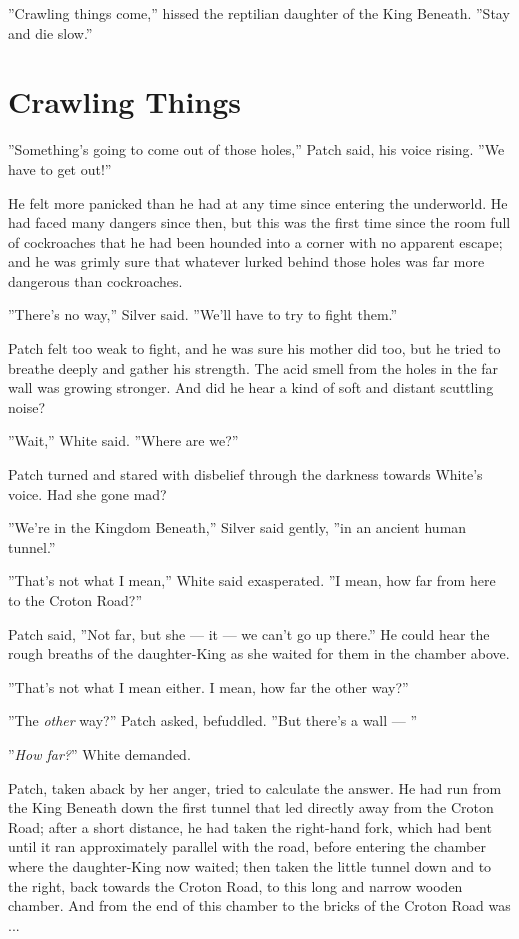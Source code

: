\documentclass[12pt]{book}
\begin{document}
''Crawling things come,'' hissed the reptilian daughter of the King Beneath. ''Stay and die slow.''


\section{Crawling Things}

''Something's going to come out of those holes,'' Patch said, his voice rising. ''We have to get out!''

He felt more panicked than he had at any time since entering the underworld. He had faced many dangers since then, but this was the first time since the room full of cockroaches that he had been hounded into a corner with no apparent escape; and he was grimly sure that whatever lurked behind those holes was far more dangerous than cockroaches.

''There's no way,'' Silver said. ''We'll have to try to fight them.''

Patch felt too weak to fight, and he was sure his mother did too, but he tried to breathe deeply and gather his strength. The acid smell from the holes in the far wall was growing stronger. And did he hear a kind of soft and distant scuttling noise?

''Wait,'' White said. ''Where are we?''

Patch turned and stared with disbelief through the darkness towards White's voice. Had she gone mad?

''We're in the Kingdom Beneath,'' Silver said gently, ''in an ancient human tunnel.''

''That's not what I mean,'' White said exasperated. ''I mean, how far from here to the Croton Road?''

Patch said, ''Not far, but she ---
it ---
we can't go up there.'' He could hear the rough breaths of the daughter-King as she waited for them in the chamber above.

''That's not what I mean either. I mean, how far the other way?''

''The {\it other} way?'' Patch asked, befuddled. ''But there's a wall ---
''

''{\it How far?}'' White demanded.

Patch, taken aback by her anger, tried to calculate the answer. He had run from the King Beneath down the first tunnel that led directly away from the Croton Road; after a short distance, he had taken the right-hand fork, which had bent until it ran approximately parallel with the road, before entering the chamber where the daughter-King now waited; then taken the little tunnel down and to the right, back towards the Croton Road, to this long and narrow wooden chamber. And from the end of this chamber to the bricks of the Croton Road was ...
\end{document}
